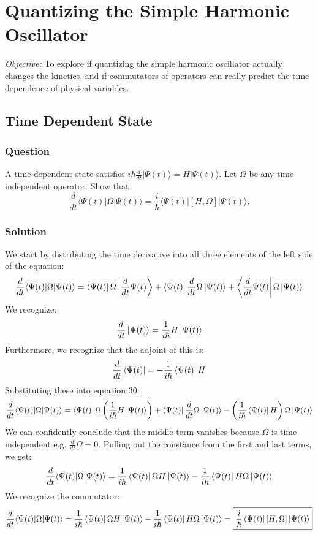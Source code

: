 \documentclass[12pt]{article}
\begin{document}
\section{Quantizing the Simple Harmonic Oscillator}

\textit{Objective:} To explore if quantizing the simple harmonic oscillator actually changes the kinetics, and if commutators of operators can really predict the time dependence of physical variables.

\subsection{Time Dependent State}
\subsubsection{Question}
A time dependent state satisfies $i\hbar \frac{d}{dt} |\Psi(t)\rangle = H|\Psi(t)\rangle$. Let $\Omega$ be any time-independent operator. Show that 
\[
\frac{d}{dt} \langle \Psi(t)|\Omega|\Psi(t)\rangle = \frac{i}{\hbar} \langle \Psi(t)|[H, \Omega]|\Psi(t)\rangle.
\]
\subsubsection{Solution}
We start by distributing the time derivative into all three elements of the left side of the equation:
\begin{equation}
    \frac{d}{dt} \langle \Psi(t)|\Omega|\Psi(t)\rangle =  \bra{\Psi(t)}\Omega\ket{\frac{d}{dt}\Psi(t)} + \bra{\Psi(t)}\frac{d}{dt}\Omega \ket{\Psi(t) } + \bra{\frac{d}{dt}\Psi(t)}\Omega\ket{\Psi(t)}
\end{equation}
We recognize:
\begin{equation}
    \frac{d}{dt}\ket{\Psi (t)} = \frac{1}{i\hbar}H\ket{\Psi (t)}
\end{equation}
Furthermore, we recognize that the adjoint of this is:
\begin{equation}
    \frac{d}{dt}\bra{\Psi (t)} = -\frac{1}{i\hbar}\bra{\Psi (t)}H
\end{equation}
Substituting these into equation 30:
\begin{equation}
    \frac{d}{dt} \langle \Psi(t)|\Omega|\Psi(t)\rangle =  \bra{\Psi(t)}\Omega\left(\frac{1}{i\hbar}H\ket{\Psi (t)}\right) + \bra{\Psi(t)}\frac{d}{dt}\Omega \ket{\Psi(t) } - \left(\frac{1}{i\hbar}\bra{\Psi (t)}H\right) \Omega\ket{\Psi(t)}
\end{equation}
We can confidently conclude that the middle term vanishes because \(\Omega\) is time independent e.g. $\frac{d}{dt}\Omega =0$. Pulling out the constance from the first and last terms, we get:
\begin{equation}
    \frac{d}{dt} \langle \Psi(t)|\Omega|\Psi(t)\rangle =  \frac{1}{i\hbar}\bra{\Psi(t)}\Omega H\ket{\Psi (t)} - \frac{1}{i\hbar}\bra{\Psi (t)}H\Omega\ket{\Psi(t)}
\end{equation}
We recognize the commutator:
\begin{equation}
    \frac{d}{dt} \langle \Psi(t)|\Omega|\Psi(t)\rangle =  \frac{1}{i\hbar}\bra{\Psi(t)}\Omega H\ket{\Psi (t)} - \frac{1}{i\hbar}\bra{\Psi (t)}H\Omega\ket{\Psi(t)} = \boxed{\frac{i}{\hbar}\bra{\Psi(t)}[H, \Omega]\ket{\Psi(t)}}
\end{equation}
\end{document}
